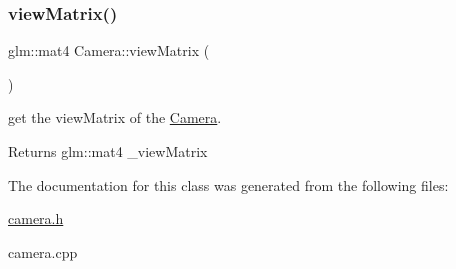 \subsubsection{\texorpdfstring{view\+Matrix()}{viewMatrix()}}
{\footnotesize\ttfamily glm\+::mat4 Camera\+::view\+Matrix (\begin{DoxyParamCaption}{ }\end{DoxyParamCaption})\hspace{0.3cm}{\ttfamily [inline]}}



get the view\+Matrix of the \hyperlink{class_camera}{Camera}. 

\begin{DoxyReturn}{Returns}
glm\+::mat4 \+\_\+view\+Matrix 
\end{DoxyReturn}


The documentation for this class was generated from the following files\+:\begin{DoxyCompactItemize}
\item 
\hyperlink{camera_8h}{camera.\+h}\item 
camera.\+cpp\end{DoxyCompactItemize}
